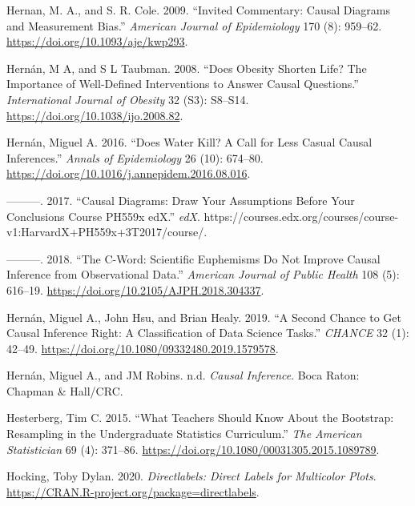\documentclass[
]{book}
\newlength{\cslhangindent}
\newenvironment{cslreferences}%
  {\setlength{\parindent}{0pt}%
  \everypar{\setlength{\hangindent}{\cslhangindent}}\ignorespaces}%
  {\par}
\begin{document}
\begin{cslreferences}
\leavevmode\hypertarget{ref-hernanInvitedCommentaryCausal2009}{}%
Hernan, M. A., and S. R. Cole. 2009. ``Invited Commentary: Causal Diagrams and Measurement Bias.'' \emph{American Journal of Epidemiology} 170 (8): 959--62. \url{https://doi.org/10.1093/aje/kwp293}.

\leavevmode\hypertarget{ref-hernanDoesObesityShorten2008}{}%
Hernán, M A, and S L Taubman. 2008. ``Does Obesity Shorten Life? The Importance of Well-Defined Interventions to Answer Causal Questions.'' \emph{International Journal of Obesity} 32 (S3): S8--S14. \url{https://doi.org/10.1038/ijo.2008.82}.

\leavevmode\hypertarget{ref-hernanDoesWaterKill2016}{}%
Hernán, Miguel A. 2016. ``Does Water Kill? A Call for Less Casual Causal Inferences.'' \emph{Annals of Epidemiology} 26 (10): 674--80. \url{https://doi.org/10.1016/j.annepidem.2016.08.016}.

\leavevmode\hypertarget{ref-hernanCausalDiagramsDraw2017}{}%
---------. 2017. ``Causal Diagrams: Draw Your Assumptions Before Your Conclusions Course \textbar{} PH559x \textbar{} edX.'' \emph{edX}. https://courses.edx.org/courses/course-v1:HarvardX+PH559x+3T2017/course/.

\leavevmode\hypertarget{ref-hernanCWordScientificEuphemisms2018}{}%
---------. 2018. ``The C-Word: Scientific Euphemisms Do Not Improve Causal Inference from Observational Data.'' \emph{American Journal of Public Health} 108 (5): 616--19. \url{https://doi.org/10.2105/AJPH.2018.304337}.

\leavevmode\hypertarget{ref-hernanSecondChanceGet2019}{}%
Hernán, Miguel A., John Hsu, and Brian Healy. 2019. ``A Second Chance to Get Causal Inference Right: A Classification of Data Science Tasks.'' \emph{CHANCE} 32 (1): 42--49. \url{https://doi.org/10.1080/09332480.2019.1579578}.

\leavevmode\hypertarget{ref-hernanCausalInference2019}{}%
Hernán, Miguel A., and JM Robins. n.d. \emph{Causal Inference}. Boca Raton: Chapman \& Hall/CRC.

\leavevmode\hypertarget{ref-hesterbergWhatTeachersShould2015}{}%
Hesterberg, Tim C. 2015. ``What Teachers Should Know About the Bootstrap: Resampling in the Undergraduate Statistics Curriculum.'' \emph{The American Statistician} 69 (4): 371--86. \url{https://doi.org/10.1080/00031305.2015.1089789}.

\leavevmode\hypertarget{ref-R-directlabels}{}%
Hocking, Toby Dylan. 2020. \emph{Directlabels: Direct Labels for Multicolor Plots}. \url{https://CRAN.R-project.org/package=directlabels}.


\end{cslreferences}
\end{document}
